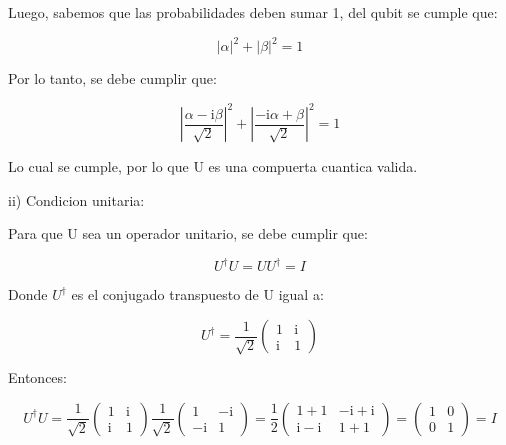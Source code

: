 \documentclass[11pt]{article}
\newcommand{\ii}{\mathrm{i}}
\begin{document}
Luego, sabemos que las probabilidades deben sumar 1, del qubit se cumple que:

\begin{equation}
    |\alpha|^2 + |\beta|^2 = 1
\end{equation}

Por lo tanto, se debe cumplir que:

\begin{equation}
    \left| \frac{\alpha - \ii \beta}{\sqrt{2}} \right|^2 + \left| \frac{-\ii \alpha + \beta}{\sqrt{2}} \right|^2 = 1
\end{equation}

Lo cual se cumple, por lo que U es una compuerta cuantica valida.

ii) Condicion unitaria:

Para que U sea un operador unitario, se debe cumplir que:

\begin{equation}
    U^\dagger U = U U^\dagger = I
\end{equation}

Donde $U^\dagger$ es el conjugado transpuesto de U igual a:

\begin{equation}
    U^\dagger = \frac{1}{\sqrt{2}} \begin{pmatrix} 1 & \ii \\ \ii & 1 \end{pmatrix}
\end{equation}

Entonces:

\begin{equation}
    U^\dagger U = \frac{1}{\sqrt{2}} \begin{pmatrix} 1 & \ii \\ \ii & 1 \end{pmatrix} \frac{1}{\sqrt{2}} \begin{pmatrix} 1 & -\ii \\ -\ii & 1 \end{pmatrix} = \frac{1}{2} \begin{pmatrix} 1 + 1 & -\ii + \ii \\ \ii - \ii & 1 + 1 \end{pmatrix} = \begin{pmatrix} 1 & 0 \\ 0 & 1 \end{pmatrix} = I
\end{equation}
\end{document}
